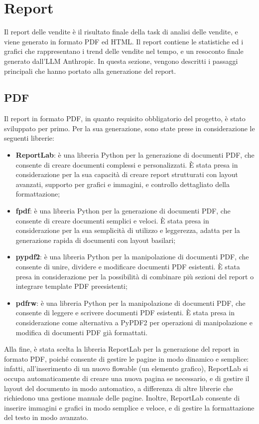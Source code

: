 \section{Report}

Il report delle vendite è il risultato finale della task di analisi delle vendite, e viene generato in formato PDF ed HTML. Il report contiene le statistiche ed i grafici che rappresentano i trend delle vendite nel tempo, e un resoconto finale generato dall'LLM Anthropic.
In questa sezione, vengono descritti i passaggi principali che hanno portato alla generazione del report.

\subsection{PDF}

Il report in formato PDF, in quanto requisito obbligatorio del progetto, è stato sviluppato per primo. Per la sua generazione, sono state prese in considerazione le seguenti librerie:
\begin{itemize}
    \item \textbf{ReportLab}: è una libreria Python per la generazione di documenti PDF, che consente di creare documenti complessi e personalizzati. È stata presa in considerazione per la sua capacità di creare report strutturati con layout avanzati, supporto per grafici e immagini, e controllo dettagliato della formattazione;
    \item \textbf{\gls{fpdf}}: è una libreria Python per la generazione di documenti PDF, che consente di creare documenti semplici e veloci. È stata presa in considerazione per la sua semplicità di utilizzo e leggerezza, adatta per la generazione rapida di documenti con layout basilari;
    \item \textbf{\gls{pypdf2}}: è una libreria Python per la manipolazione di documenti PDF, che consente di unire, dividere e modificare documenti PDF esistenti. È stata presa in considerazione per la possibilità di combinare più sezioni del report o integrare template PDF preesistenti;
    \item \textbf{\gls{pdfrw}}: è una libreria Python per la manipolazione di documenti PDF, che consente di leggere e scrivere documenti PDF esistenti. È stata presa in considerazione come alternativa a PyPDF2 per operazioni di manipolazione e modifica di documenti PDF già formattati.
\end{itemize}

Alla fine, è stata scelta la libreria ReportLab per la generazione del report in formato PDF, poiché consente di gestire le pagine in modo dinamico e semplice: infatti, all'inserimento di un nuovo flowable (un elemento grafico), ReportLab si occupa automaticamente di creare una nuova pagina se necessario, e di gestire il layout del documento in modo automatico, a differenza di altre librerie che richiedono una gestione manuale delle pagine. Inoltre, ReportLab consente di inserire immagini e grafici in modo semplice e veloce, e di gestire la formattazione del testo in modo avanzato.

